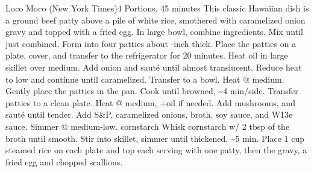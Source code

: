 \documentclass[letterpaper]{article}
\begin{document}
\begin{recipe}{Loco Moco (New York Times)}{4 Portions, 45 minutes}{}
  \freeform This classic Hawaiian dish is a ground beef patty above a pile of white rice, smothered with caramelized onion gravy and topped with a fried egg.
  In large bowl, combine ingredients. Mix until just combined. Form into four patties about -inch thick. Place the patties on a plate, cover, and transfer to the refrigerator for 20 minutes.
  Heat oil in large skillet over medium. Add onion and sauté until almost translucent. Reduce heat to low and continue until caramelized. Transfer to a bowl. 
  Heat @ medium. Gently place the patties in the pan. Cook until browned, \textasciitilde4 min/side. Transfer patties to a clean plate.
  Heat @ medium, +oil if needed. Add mushrooms, and sauté until tender. Add S\&P, caramelized onions, broth, soy sauce, and W13e sauce. Simmer @ medium-low.
   {cornstarch}
  Whisk cornstarch w/ 2 tbsp of the broth until smooth. Stir into skillet, simmer until thickened. \textasciitilde5 min.
  Place 1 cup steamed rice on each plate and top each serving with one patty, then the gravy, a fried egg and chopped scallions.

  \end{recipe}
\end{document}
